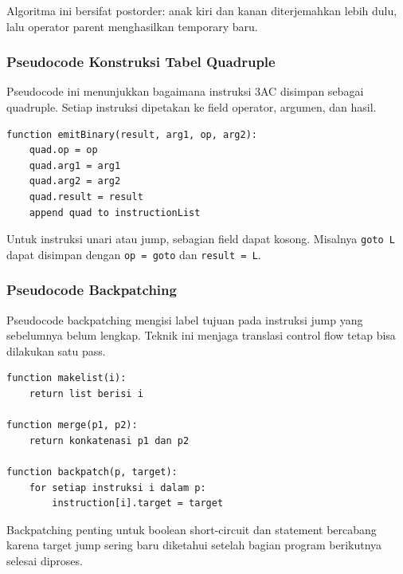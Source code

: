 Algoritma ini bersifat postorder: anak kiri dan kanan diterjemahkan lebih dulu, lalu operator parent menghasilkan temporary baru.

\subsubsection{Pseudocode Konstruksi Tabel Quadruple}

\begin{jawab}
Pseudocode ini menunjukkan bagaimana instruksi 3AC disimpan sebagai quadruple. Setiap instruksi dipetakan ke field operator, argumen, dan hasil.
\end{jawab}

\begin{lstlisting}[caption={Pseudocode emit quadruple}, label={lst:emit-quadruple}]
function emitBinary(result, arg1, op, arg2):
    quad.op = op
    quad.arg1 = arg1
    quad.arg2 = arg2
    quad.result = result
    append quad to instructionList
\end{lstlisting}

Untuk instruksi unari atau jump, sebagian field dapat kosong. Misalnya \texttt{goto L} dapat disimpan dengan \texttt{op = goto} dan \texttt{result = L}.

\subsubsection{Pseudocode Backpatching}

\begin{jawab}
Pseudocode backpatching mengisi label tujuan pada instruksi jump yang sebelumnya belum lengkap. Teknik ini menjaga translasi control flow tetap bisa dilakukan satu pass.
\end{jawab}

\begin{lstlisting}[caption={Pseudocode operasi dasar backpatching}, label={lst:backpatching}]
function makelist(i):
    return list berisi i

function merge(p1, p2):
    return konkatenasi p1 dan p2

function backpatch(p, target):
    for setiap instruksi i dalam p:
        instruction[i].target = target
\end{lstlisting}

Backpatching penting untuk boolean short-circuit dan statement bercabang karena target jump sering baru diketahui setelah bagian program berikutnya selesai diproses.
